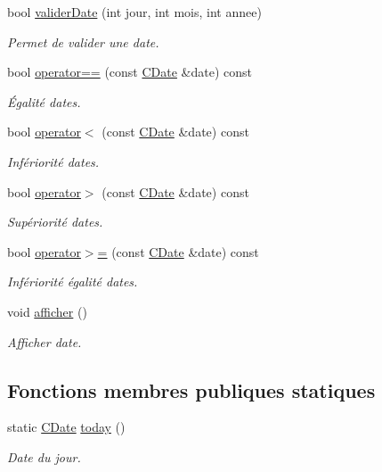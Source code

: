 \begin{DoxyCompactItemize}
bool \hyperlink{class_c_date_a45a71c91bd790e7b84405c8128e4094b}{validerDate} (int jour, int mois, int annee)
\begin{DoxyCompactList}\small\item\em Permet de valider une date. \item\end{DoxyCompactList}\item 
bool \hyperlink{class_c_date_a82e5b049e86145b62893f194b5638ad6}{operator==} (const \hyperlink{class_c_date}{CDate} \&date) const 
\begin{DoxyCompactList}\small\item\em Égalité dates. \item\end{DoxyCompactList}\item 
bool \hyperlink{class_c_date_a2764c65e43a4ee956cd16f8ce242dbc7}{operator$<$} (const \hyperlink{class_c_date}{CDate} \&date) const 
\begin{DoxyCompactList}\small\item\em Infériorité dates. \item\end{DoxyCompactList}\item 
bool \hyperlink{class_c_date_ac653ba135b3681a64448872b2d6a0c17}{operator$>$} (const \hyperlink{class_c_date}{CDate} \&date) const 
\begin{DoxyCompactList}\small\item\em Supériorité dates. \item\end{DoxyCompactList}\item 
bool \hyperlink{class_c_date_ac0553a16a486d0ec1c375846821ef460}{operator$>$=} (const \hyperlink{class_c_date}{CDate} \&date) const 
\begin{DoxyCompactList}\small\item\em Infériorité égalité dates. \item\end{DoxyCompactList}\item 
void \hyperlink{class_c_date_a9b58a7c96cf53352328906e30891e4e4}{afficher} ()
\begin{DoxyCompactList}\small\item\em Afficher date. \item\end{DoxyCompactList}\end{DoxyCompactItemize}
\subsection*{Fonctions membres publiques statiques}
\begin{DoxyCompactItemize}
\item 
static \hyperlink{class_c_date}{CDate} \hyperlink{class_c_date_a5367206ed910298afbf1bf57efe47c92}{today} ()
\begin{DoxyCompactList}\small\item\em Date du jour. \item\end{DoxyCompactList}\end{DoxyCompactItemize}


